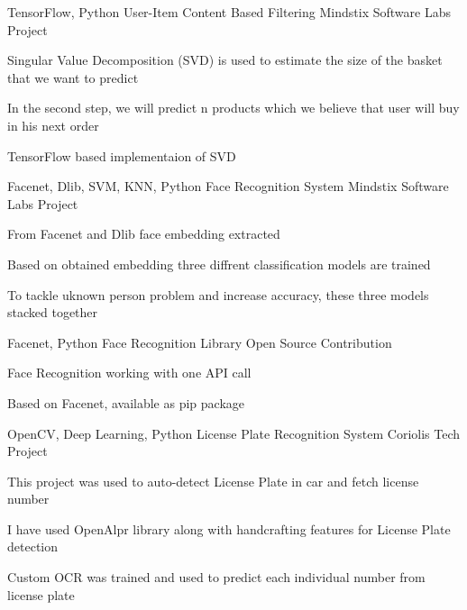 \begin{cventries}
   \cventry
    {TensorFlow, Python} %
    {User-Item Content Based Filtering} %
    {Mindstix Software Labs Project} %
    {} %
    {
      \begin{cvitems} %
        \item {Singular Value Decomposition (SVD) is used to estimate the size of the basket that we want to predict}
        \item {In the second step, we will predict n products which we believe that user will buy in his next order}
        \item {TensorFlow based implementaion of SVD}
      \end{cvitems}
    }
   
   \cventry
    {Facenet, Dlib, SVM, KNN, Python} %
    {Face Recognition System} %
    {Mindstix Software Labs Project} %
    {} %
    {
      \begin{cvitems} %
        \item {From Facenet and Dlib face embedding extracted}
        \item {Based on obtained embedding three diffrent classification models are trained }
        \item {To tackle uknown person problem and increase accuracy, these three models stacked together}
      \end{cvitems}
    }

    \cventry
    {Facenet, Python} %
    {Face Recognition Library} %
    {Open Source Contribution} %
    {} %
    {
      \begin{cvitems} %
        \item {Face Recognition working with one API call}
        \item {Based on Facenet, available as pip package}
      \end{cvitems}
    }

   \cventry
    {OpenCV, Deep Learning, Python} %
    {License Plate Recognition System} %
    {Coriolis Tech Project} %
    {}%
    {
      \begin{cvitems} %
        \item {This project was used to auto-detect License Plate in car and fetch license number}
        \item {I have used OpenAlpr library along with handcrafting features for License Plate detection}
        \item {Custom OCR was trained and used to predict each individual number from license plate}
      \end{cvitems}
    }
    

\end{cventries}
